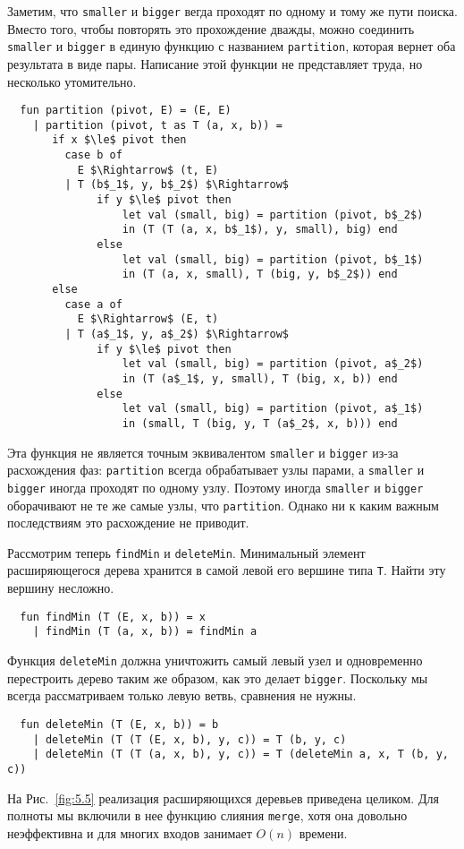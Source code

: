 Заметим, что \lstinline!smaller! и \lstinline!bigger! вегда проходят
по одному и тому же пути поиска. Вместо того, чтобы повторять это
прохождение дважды, можно соединить \lstinline!smaller! и
\lstinline!bigger! в единую функцию с названием \lstinline!partition!,
которая вернет оба результата в виде пары.  Написание этой функции не
представляет труда, но несколько утомительно.
\begin{lstlisting}
  fun partition (pivot, E) = (E, E)
    | partition (pivot, t as T (a, x, b)) =
       if x $\le$ pivot then
         case b of
           E $\Rightarrow$ (t, E)
         | T (b$_1$, y, b$_2$) $\Rightarrow$
              if y $\le$ pivot then
                  let val (small, big) = partition (pivot, b$_2$)
                  in (T (T (a, x, b$_1$), y, small), big) end
              else
                  let val (small, big) = partition (pivot, b$_1$)
                  in (T (a, x, small), T (big, y, b$_2$)) end
       else
         case a of
           E $\Rightarrow$ (E, t)
         | T (a$_1$, y, a$_2$) $\Rightarrow$
              if y $\le$ pivot then
                  let val (small, big) = partition (pivot, a$_2$)
                  in (T (a$_1$, y, small), T (big, x, b)) end
              else
                  let val (small, big) = partition (pivot, a$_1$)
                  in (small, T (big, y, T (a$_2$, x, b))) end         
\end{lstlisting}

\begin{remark}
  Эта функция не является точным эквивалентом \lstinline!smaller! и
  \lstinline!bigger! из-за расхождения фаз: \lstinline!partition!
  всегда обрабатывает узлы парами, а \lstinline!smaller! и
  \lstinline!bigger! иногда проходят по одному узлу.  Поэтому иногда
  \lstinline!smaller! и \lstinline!bigger! оборачивают не те же самые
  узлы, что \lstinline!partition!. Однако ни к каким важным
  последствиям это расхождение не приводит.
\end{remark}

Рассмотрим теперь \lstinline!findMin! и
\lstinline!deleteMin!. Минимальный элемент расширяющегося дерева
хранится в самой левой его вершине типа \lstinline!T!. Найти эту
вершину несложно.
\begin{lstlisting}
  fun findMin (T (E, x, b)) = x
    | findMin (T (a, x, b)) = findMin a
\end{lstlisting}
Функция \lstinline!deleteMin! должна уничтожить самый левый узел и
одновременно перестроить дерево таким же образом, как это делает
\lstinline!bigger!. Поскольку мы всегда рассматриваем только левую
ветвь, сравнения не нужны.
\begin{lstlisting}
  fun deleteMin (T (E, x, b)) = b
    | deleteMin (T (T (E, x, b), y, c)) = T (b, y, c)
    | deleteMin (T (T (a, x, b), y, c)) = T (deleteMin a, x, T (b, y, c))
\end{lstlisting}
На Рис.~\ref{fig:5.5} реализация расширяющихся
деревьев приведена целиком. Для полноты мы включили в нее функцию слияния
\lstinline!merge!, хотя она довольно неэффективна и для многих входов
занимает $O(n)$ времени.

